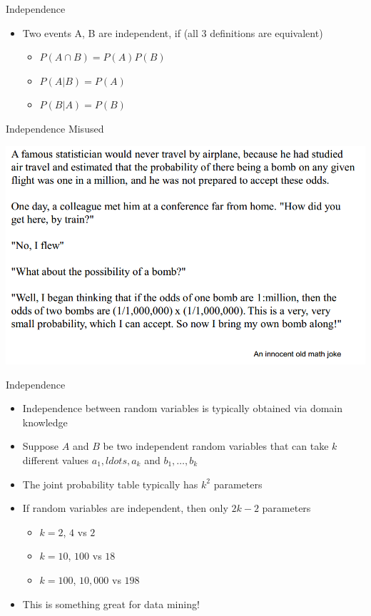 \documentclass{beamer}
\begin{document}
\begin{frame}{Independence}
    \begin{itemize}
        \item Two events A, B are independent, if (all 3 definitions are equivalent)
        \begin{itemize}
            \item $P(A \cap B) = P(A) P(B)$
            \item $P(A|B) = P(A)$
            \item $P(B|A) = P(B)$
        \end{itemize}
    \end{itemize}
\end{frame}

\begin{frame}{Independence Misused}
    \begin{center}
        \includegraphics[scale=0.36]{independenceJoke.png}
    \end{center}
\end{frame}

\begin{frame}{Independence}
    \begin{itemize}
        \item Independence between random variables is typically obtained via domain knowledge
        \item Suppose $A$ and $B$ be two independent random variables that can take $k$ different values $a_1, ldots, a_k$ and $b_1, \ldots, b_k$
        \item The joint probability table typically has $k^2$ parameters
        \item If random variables are independent, then only $2k-2$ parameters
        \begin{itemize}
            \item $k=2$, $4$ vs $2$
            \item $k=10$, $100$ vs $18$
            \item $k=100$, $10,000$ vs $198$
        \end{itemize}
        \item This is something great for data mining!
    \end{itemize}
\end{frame}
\end{document}
